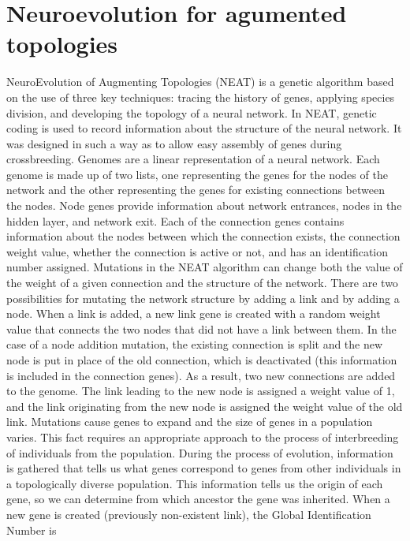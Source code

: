\FloatBarrier
\section{Neuroevolution for agumented topologies}
NeuroEvolution of Augmenting Topologies (NEAT) is a genetic algorithm based on the use of three 
key techniques: tracing the history of genes, applying species division, and developing the 
topology of a neural network. 
In NEAT, genetic coding is used to record information about the structure of the neural network. 
It was designed in such a way as to allow easy assembly of genes during crossbreeding. 
Genomes are a linear representation of a neural network. Each genome is made up of two lists, 
one representing the genes for the nodes of the network and the other representing the 
genes for existing connections between the nodes. Node genes provide information about network 
entrances, nodes in the hidden layer, and network exit. 
Each of the connection genes contains information about the nodes between which the connection 
exists, the connection weight value, whether the connection is active or not, 
and has an identification number assigned. 
Mutations in the NEAT algorithm can change both the value of the weight of a given connection and 
the structure of the network. 
There are two possibilities for mutating the network structure by adding a link and by adding 
a node. 
When a link is added, a new link gene is created with a random weight value that connects the 
two nodes that did not have a link between them. 
In the case of a node addition mutation, the existing connection is split and the new node is put 
in place of the old connection, which is deactivated (this information is included in 
the connection genes). 
As a result, two new connections are added to the genome. 
The link leading to the new node is assigned a weight value of 1, and the link originating from 
the new node is assigned the weight value of the old link. 
Mutations cause genes to expand and the size of genes in a population varies. 
This fact requires an appropriate approach to the process of interbreeding of individuals from the 
population. During the process of evolution, information is gathered that tells us what genes 
correspond to genes from other individuals in a topologically diverse population. 
This information tells us the origin of each gene, so we can determine from which ancestor the 
gene was inherited. 
When a new gene is created (previously non-existent link), the Global Identification Number is 
